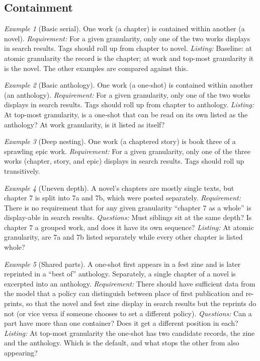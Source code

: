 \documentclass{amsart}
\theoremstyle{remark}
\newtheorem{eg}{Example}
\begin{document}
    \subsection*{Containment}
    \begin{eg}[Basic serial]\label{eg:chapter-novel}
        One work (a chapter) is contained within another (a novel).
        \emph{Requirement:} For a given granularity, only one of the two works displays in search results. Tags should roll up from chapter to novel.
        \emph{Listing:} Baseline: at atomic granularity the record is the chapter; at work and top-most granularity it is the novel. The other examples are compared against this.
    \end{eg}
    \begin{eg}[Basic anthology]\label{eg:oneshot-anthology}
        One work (a one-shot) is contained within another (an anthology).
        \emph{Requirement:} For a given granularity, only one of the two works displays in search results. Tags should roll up from chapter to anthology.
        \emph{Listing:} At top-most granularity, is a one-shot that can be read on its own listed as the anthology? At work granularity, is it listed as itself?
    \end{eg}
    \begin{eg}[Deep nesting]\label{eg:epic}
        One work (a chaptered story) is book three of a sprawling epic work.
        \emph{Requirement:} For a given granularity, only one of the three works (chapter, story, and epic) displays in search results. Tags should roll up transitively.
    \end{eg}
    \begin{eg}[Uneven depth]\label{eg:uneven-depth}
        A novel's chapters are mostly single texts, but chapter 7 is split into 7a and 7b, which were posted separately.
        \emph{Requirement:} There is no requirement that for any given granularity ``chapter 7 as a whole'' is display-able in search results.
        \emph{Questions:} Must siblings sit at the same depth? Is chapter 7 a grouped work, and does it have its own sequence?
        \emph{Listing:} At atomic granularity, are 7a and 7b listed separately while every other chapter is listed whole?
    \end{eg}
    \begin{eg}[Shared parts]\label{eg:reprint}
        A one-shot first appears in a fest zine and is later reprinted in a ``best of'' anthology. Separately, a single chapter of a novel is excerpted into an anthology.
        \emph{Requirement:} There should have sufficient data from the model that a policy can distinguish between place of first publication and re-prints, so that the novel and fest zine display in search results but the reprints do not (or vice versa if someone chooses to set a different policy). 
        \emph{Questions:} Can a part have more than one container? Does it get a different position in each?
        \emph{Listing:} At top-most granularity the one-shot has two candidate records, the zine and the anthology. Which is the default, and what stops the other from also appearing?
    \end{eg}
\end{document}
